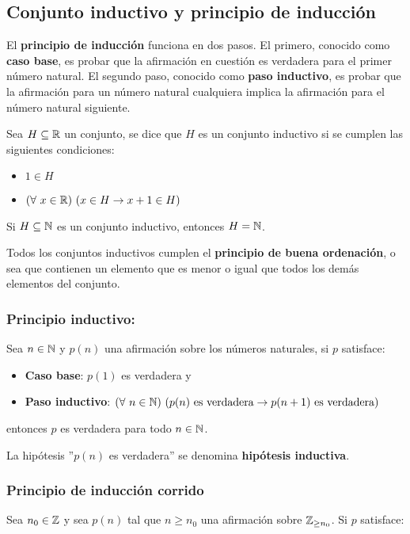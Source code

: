 \subsection{Conjunto inductivo y principio de inducción}

El \textbf{principio de inducción} funciona en dos pasos. El primero, conocido como \textbf{caso base}, es probar que la afirmación en cuestión es verdadera para el primer número natural. El segundo paso, conocido como \textbf{paso inductivo}, es probar que la afirmación para un número natural cualquiera implica la afirmación para el número natural siguiente.

Sea $H\subseteq\mathbb{R}$ un conjunto, se dice que $H$ es un conjunto inductivo si se cumplen las siguientes condiciones:

\begin{itemize}
    \item $1\in H$
    \item $(\forall~x\in\mathbb{R})~(x\in H\to x+1 \in H)$
\end{itemize}

Si $H\subseteq\mathbb{N}$ es un conjunto inductivo, entonces $H = \mathbb{N}$.

Todos los conjuntos inductivos cumplen el \textbf{principio de buena ordenación}, o sea que contienen un elemento que es menor o igual que todos los demás elementos del conjunto.

\subsubsection{Principio inductivo:} Sea $n\in\mathbb{N}$ y $p(n)$ una afirmación sobre los números naturales, si $p$ satisface:

\begin{itemize}
    \item \textbf{Caso base}: $p(1)$ es verdadera y
    \item \textbf{Paso inductivo}: $(\forall~n\in\mathbb{N})~(p(n) \text{ es verdadera}\to p(n+1) \text{ es verdadera})$
\end{itemize}
entonces $p$ es verdadera para todo $n\in\mathbb{N}$.

La hipótesis ''$p(n)$ es verdadera'' se denomina \textbf{hipótesis inductiva}.

\subsubsection{Principio de inducción corrido}
Sea $n_0\in\mathbb{Z}$ y sea $p(n)$ tal que $n\geq n_0$ una afirmación sobre $\mathbb{Z}_{\geq n_0}$. Si $p$ satisface:


